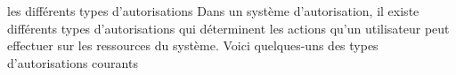 \begin{frame}{les différents types d'autorisations }
    Dans un système d'autorisation, il existe différents types d'autorisations qui déterminent les actions qu'un utilisateur peut effectuer sur les ressources du système. Voici quelques-uns des types d'autorisations courants
\end{frame}